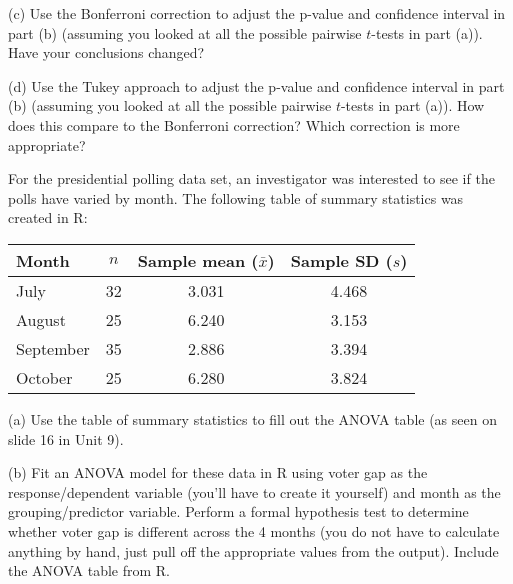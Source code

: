 \documentclass[11pt]{article}
\begin{document}
\vspace{0.1in}

\noindent (c) Use the Bonferroni correction to adjust the p-value and confidence interval in part (b) (assuming you looked at all the possible pairwise $t$-tests in part (a)).  Have your conclusions changed?


\vspace{0.1in}

\noindent (d) Use the Tukey approach to adjust the p-value and confidence interval in part (b) (assuming you looked at all the possible pairwise $t$-tests in part (a)).  How does this compare to the Bonferroni correction?  Which correction is more appropriate?

\vspace{0.3in}






 For the presidential polling data set, an investigator was interested to see if the polls have varied by month.  The following table of summary statistics was created in R:
\begin{center}
	\begin{tabular}{lccc}
		\hline
		Month & $n$ & Sample mean ($\bar{x}$) &  Sample SD ($s$) \\
		\hline
July   &   32 & 3.031 & 4.468 \\
August  &  25 & 6.240 & 3.153 \\
September & 35 & 2.886 & 3.394 \\
October &  25 & 6.280 & 3.824 \\
		\hline
	\end{tabular}
\end{center}


\noindent (a) Use the table of summary statistics to fill out the ANOVA table (as seen on slide 16 in Unit 9).

\vspace{0.1in}

\noindent (b) Fit an ANOVA model for these data in R using voter gap as the response/dependent variable (you'll have to create it yourself) and month as the grouping/predictor variable.  Perform a formal hypothesis test to determine whether voter gap is different across the 4 months (you do not have to calculate anything by hand, just pull off the appropriate values from the  output).  Include the ANOVA table from R.  

\vspace{0.1in}
\end{document}
